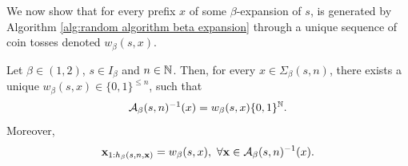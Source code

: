 We now show that for every prefix $x$ of some $\beta$-expansion of $s$, is generated by Algorithm \ref{alg:random algorithm beta expansion} through a unique sequence of coin tosses denoted $w_\beta(s,x)$.
\begin{lemma}\label{lem:the set of preimages by the dajani algorithm is a cylinder}
    Let $\beta \in (1,2)$, $s \in I_\beta$ and $n \in \mathbb{N}$. Then, for every $x \in \Sigma_\beta(s,n)$, there exists a unique $w_\beta(s, x) \in \{0,1\}^{\leq n}$, such that 
    \begin{equation}
        \mathcal{A}_\beta(s,n)^{-1}(x) = w_\beta(s, x) \{0,1\}^{\mathbb{N}}.
    \end{equation}
    Moreover, 
    \begin{equation}
        \xf_{1:h_\beta(s,n,\xf)} = w_\beta(s,x), \ \forall \xf \in \AM_\beta(s,n)^{-1}(x).
    \end{equation}
\end{lemma}
